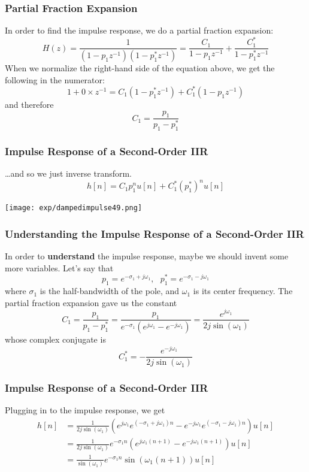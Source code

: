 \documentclass{beamer}
\begin{document}
\begin{frame}
  \frametitle{Partial Fraction Expansion}

  In order to find the impulse response, we do a partial fraction expansion:
  \[
  H(z) = \frac{1}{(1-p_1z^{-1})(1-p_1^*z^{-1})}= \frac{C_1}{1-p_1z^{-1}} + \frac{C_1^*}{1-p_1^*z^{-1}}
  \]
  When we normalize the right-hand side of the equation above, we get the following
  in the numerator:
  \begin{displaymath}
    1 + 0\times z^{-1} = C_1(1-p_1^*z^{-1}) + C_1^*(1-p_1z^{-1})
  \end{displaymath}
  and therefore
  \begin{displaymath}
    C_1 = \frac{p_1}{p_1-p_1^*}
  \end{displaymath}
\end{frame}

\begin{frame}
  \frametitle{Impulse Response of a Second-Order IIR}

  \ldots and so we just inverse transform.
  \[
  h[n] = C_1p_1^n u[n] + C_1^* (p_1^*)^n u[n]
  \]
  \centerline{\texttt{[image: exp/dampedimpulse49.png]}}
\end{frame}

\begin{frame}
  \frametitle{Understanding the Impulse Response of a Second-Order IIR}

  In order to {\bf understand} the impulse response, maybe we should
  invent some more variables.  Let's say that
  \[
  p_1 = e^{-\sigma_1+j\omega_1},~~~p_1^* = e^{-\sigma_1-j\omega_1}
  \]
  where $\sigma_1$ is the half-bandwidth of the pole, and $\omega_1$
  is its center frequency.  The partial fraction expansion gave us the constant
  \begin{displaymath}
    C_1 = \frac{p_1}{p_1-p_1^*}= \frac{p_1}{e^{-\sigma_1}\left(e^{j\omega_1}-e^{-j\omega_1}\right)}
    = \frac{e^{j\omega_1}}{2j\sin(\omega_1)}
  \end{displaymath}
  whose complex conjugate is
  \[
  C_1^* = -\frac{e^{-j\omega_1}}{2j\sin(\omega_1)}
  \]
\end{frame}

\begin{frame}
  \frametitle{Impulse Response of a Second-Order IIR}

  Plugging in to the impulse response, we get
  \begin{align*}
    h[n] &= \frac{1}{2j\sin(\omega_1)}
    \left(e^{j\omega_1}e^{(-\sigma_1+j\omega_1)n}-e^{-j\omega_1}e^{(-\sigma_1-j\omega_1)n}\right)u[n]\\
    &= \frac{1}{2j\sin(\omega_1)}e^{-\sigma_1n}\left(e^{j\omega_1(n+1)}-e^{-j\omega_1(n+1)}\right)u[n]\\
    &= \frac{1}{\sin(\omega_1)} e^{-\sigma_1n}\sin(\omega_1(n+1)) u[n]
  \end{align*}
\end{frame}
\end{document}

